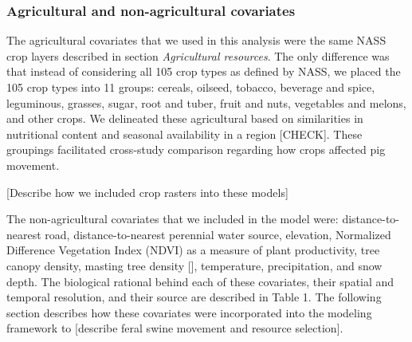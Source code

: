\documentclass[a4paper]{article}
\begin{document}
\subsubsection*{Agricultural and non-agricultural covariates}

The agricultural covariates that we used in this analysis were the same NASS crop layers described in section \emph{Agricultural resources}.  The only difference was that instead of considering all 105 crop types as defined by NASS, we placed the 105 crop types into 11 groups: cereals, oilseed, tobacco, beverage and spice, leguminous, grasses, sugar, root and tuber, fruit and nuts, vegetables and melons, and other crops.  We delineated these agricultural based on similarities in nutritional content and seasonal availability in a region [CHECK]. These groupings facilitated cross-study comparison regarding how crops affected pig movement.

[Describe how we included crop rasters into these models]

The non-agricultural covariates that we included in the model were: distance-to-nearest road, distance-to-nearest perennial water source, elevation, Normalized Difference Vegetation Index (NDVI) as a measure of plant productivity, tree canopy density, masting tree density [], temperature, precipitation, and snow depth. The biological rational behind each of these covariates, their spatial and temporal resolution, and their source are described in Table 1. The following section describes how these covariates were incorporated into the modeling framework to [describe feral swine movement and resource selection].

\end{document}
